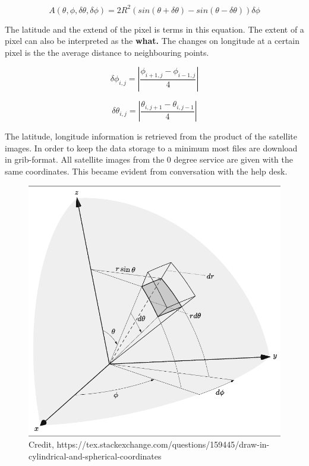 \begin{equation} \label{eq:sphere_finish}
    A \left( \theta, \phi, \delta \theta, \delta \phi   \right)= 2R^2 \left( sin\left( \theta + \delta \theta  \right) - sin\left(  \theta - \delta \theta  \right) \right) \delta \phi
\end{equation} 

The latitude and the extend of the pixel is terms in this equation. The extent of a pixel can also be interpreted as the \textbf{what.} The changes on longitude at a certain pixel is the the average distance to neighbouring points.

\begin{equation} \label{eq:app_lon}
    \delta \phi_{i,j} = \left| \frac{\phi_{i+1,j} - \phi_{i-1, j}}{4} \right|
\end{equation}

\begin{equation} \label{eq:app_lat}
    \delta \theta_{i,j} = \left| \frac{\theta_{i,j+1} - \theta_{i, j-1}}{4} \right|
\end{equation}

The latitude, longitude information is retrieved from the product of the satellite images. In order to keep the data storage to a minimum most files are download in grib-format. All satellite images from the 0 degree service are given with the same coordinates. This became evident from conversation with the help desk. 
\begin{figure}[h]
    \centering
    \includegraphics[scale = 0.6]{Chapter2_Theory/images/coordinates.png}
    \caption{Credit, https://tex.stackexchange.com/questions/159445/draw-in-cylindrical-and-spherical-coordinates}
    \label{fig:coords}
\end{figure}

